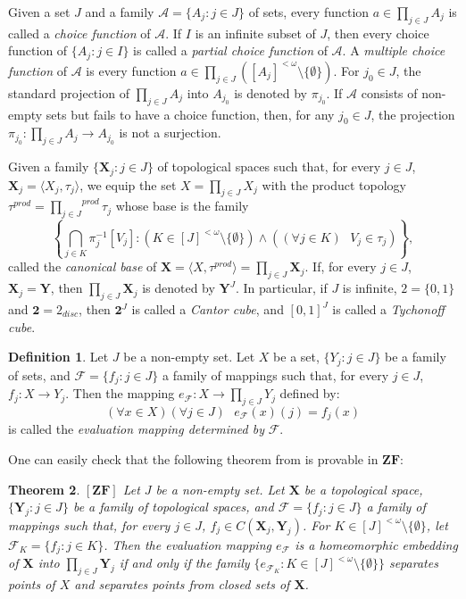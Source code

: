 \documentclass[12pt,twoside,leqno]{article}
\theoremstyle{plain}
\newtheorem{theorem}{Theorem}[section]
\theoremstyle{definition}
\newtheorem{definition}[theorem]{Definition}
\theoremstyle{remark}
\begin{document}
Given  a set $J$ and a family $\mathcal{A}=\{A_j: j\in J\}$ of sets, every function $a\in\prod\limits_{j\in J}A_j$ is called a \emph{choice function} of $\mathcal{A}$. If $I$ is an infinite subset of $J$, then every choice function of $\{A_j: j\in I\}$ is called a \emph{partial choice function} of $\mathcal{A}$. A \emph{multiple choice function} of $\mathcal{A}$ is every function $a\in\prod\limits_{j\in J}([A_j]^{<\omega}\setminus\{\emptyset\})$. For $j_0\in J$, the standard projection of $\prod\limits_{j\in J}A_j$ into $A_{j_0}$ is denoted by $\pi_{j_0}$. If $\mathcal{A}$ consists of non-empty sets but fails to have a choice function, then, for any $j_0\in J$, the projection $\pi_{j_0}:\prod\limits_{j\in J}A_j\to A_{j_0}$ is not a surjection. 

Given a family $\{ \mathbf{X}_j: j\in J\}$ of topological spaces such that, for every $j\in J$,  $\mathbf{X}_j=\langle X_j, \tau_j\rangle$, we equip the set $X=\prod\limits_{j\in J}X_j$ with the product topology $\tau^{prod}={\prod\limits_{j\in J}}^{prod}\tau_j$ whose base is the family 
$$\left\{\bigcap\limits_{j\in K}\pi_j^{-1}[V_j]: (K\in[J]^{<\omega}\setminus\{\emptyset\})\wedge ((\forall j\in K)\text{ } V_j\in\tau_j)\right\},$$
called  the \emph{canonical base} of $\mathbf{X}=\langle X, \tau^{prod}\rangle=\prod\limits_{j\in J}\mathbf{X}_j$.  If, for every $j\in J$, $\mathbf{X}_j=\mathbf{Y}$, then $\prod\limits_{j\in J}\mathbf{X}_j$ is denoted by $\mathbf{Y}^J$. In particular, if $J$ is infinite, $2=\{0,1\}$ and $\mathbf{2}=2_{disc}$, then $\mathbf{2}^J$ is called a \emph{Cantor cube}, and  $[0,1]^J$ is called a \emph{Tychonoff cube}.  

\begin{definition}
	\label{s1:d7}
	Let $J$ be a non-empty set.  Let $X$ be a set,  $\{Y_j: j\in J\}$ be a family of sets, and  $\mathcal{F}=\{f_j: j\in J\}$ a family of mappings such that, for every $j\in J$,  $f_j: X\to Y_j$. Then the mapping $e_{\mathcal{F}}: X\to\prod\limits_{j\in J}Y_j$ defined by:
	$$(\forall x\in X)(\forall j\in J)\text{ } e_{\mathcal{F}}(x)(j)=f_j(x)$$
	is called the \emph{evaluation mapping determined by} $\mathcal{F}$.
\end{definition}

One can easily check that the following theorem from \cite[Exercise 2.3.D]{en} is provable in $\mathbf{ZF}$:

\begin{theorem}
	\label{s1:t8}
	$[\mathbf{ZF}]$
	Let $J$ be a non-empty set.  Let $\mathbf{X}$ be a topological space,  $\{\mathbf{Y}_j: j\in J\}$ be a family of topological spaces, and  $\mathcal{F}=\{f_j: j\in J\}$ a family of mappings such that, for every $j\in J$,  $f_j\in C(\mathbf{X}_j, \mathbf{Y}_j)$. For $K\in [J]^{<\omega}\setminus\{\emptyset\}$, let $\mathcal{F}_K=\{f_j: j\in K\}$. Then the evaluation mapping $e_{\mathcal{F}}$ is a homeomorphic embedding of $\mathbf{X}$ into $\prod\limits_{j\in J}\mathbf{Y}_j$ if and only if the family $\{ e_{\mathcal{F}_K}: K\in [J]^{<\omega}\setminus\{\emptyset\}\}$ separates points of $X$ and separates points from closed sets of $\mathbf{X}$.
\end{theorem}
\end{document}
